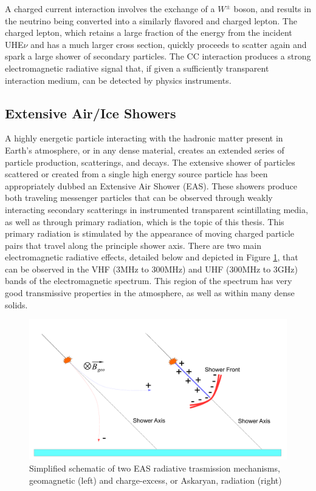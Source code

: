 		A charged current interaction involves the exchange of a $W^{\pm}$ boson, and results in the neutrino being converted into a similarly flavored and charged lepton.  The charged lepton, which retains a large fraction of the energy from the incident UHE$\nu$ and has a much larger cross section, quickly proceeds to scatter again and spark a large shower of secondary particles.  The CC interaction produces a strong electromagnetic radiative signal that, if given a sufficiently transparent interaction medium, can be detected by physics instruments.
			

	\subsection{Extensive Air/Ice Showers}
		A highly energetic particle interacting with the hadronic matter present in Earth's atmosphere, or in any  dense material, creates an extended series of particle production, scatterings, and decays.  The extensive shower of particles scattered or created from a single high energy source particle has been appropriately dubbed an Extensive Air Shower (EAS).  These showers produce both traveling messenger particles that can be observed through weakly interacting secondary scatterings in instrumented transparent scintillating media, as well as through primary radiation, which is the topic of this thesis.  This primary radiation is stimulated by the appearance of moving charged particle pairs that travel along the principle shower axis.  There are two main electromagnetic radiative effects, detailed below and depicted in Figure \ref{fig:EASRadiation}, that can be observed in the  VHF (3MHz to 300MHz) and UHF (300MHz to 3GHz) bands of the electromagnetic spectrum.  This region of the spectrum has very good transmissive properties in the atmosphere, as well as within many dense solids.\cite{Besson2009348}\cite{VuFind-000215473}\cite{Barrella:2010vs}
		

\begin{figure}
	\centering
	\includegraphics[width=\textwidth]{figures/EASRadiation}
	\caption{Simplified schematic of two EAS radiative trasmission mechanisms, geomagnetic (left) and charge-excess, or Askaryan, radiation (right)}
	\label{fig:EASRadiation}
\end{figure}

